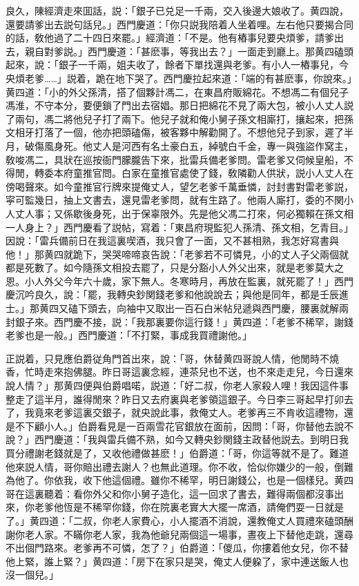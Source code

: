 良久，陳經濟走來囬話，説：「銀子已兑足一千兩，交入後邊大娘收了。黄四說，還要請爹出去説句話兒。」西門慶道：「你只説我陪着人坐着哩。左右他只要揭合同的話，敎他過了二十四日來罷。」經濟道：「不是。他有樁事兒要央煩爹，請爹出去，親自對爹説。」西門慶道：「甚麽事，等我出去？」一面走到廳上。那黄四磕頭起來，說：「銀子一千兩，姐夫收了，餘者下單找還與老爹。有小人一樁事兒，今央煩老爹……」説着，跪在地下哭了。西門慶拉起來道：「端的有甚麽事，你說來。」黄四道：「小的外父孫清，搭了個夥計馮二，在東昌府販綿花。不想馮二有個兒子馮淮，不守本分，要便鎖了門出去宿娼。那日把綿花不見了兩大包，被小人丈人説了兩句，馮二將他兒子打了兩下。他兒子就和俺小舅子孫文相廝打，攘起來，把孫文相牙打落了一個，他亦把頭磕傷，被客夥中解勸開了。不想他兒子到家，遲了半月，破傷風身死。他丈人是河西有名土豪白五，綽號白千金，專一與強盜作窝主，敎唆馮二，具狀在巡按衙門朦朧告下來，批雷兵備老爹問。雷老爹又伺候皇船，不得閒，轉委本府童推官問。白家在童推官處使了錢，敎隣勸人供狀，説小人丈人在傍喝聲來。如今童推官行牌來提俺丈人，望乞老爹千萬垂憐，討封書對雷老爹説，寜可監幾日，抽上文書去，還見雷老爹問，就有生路了。他兩人廝打，委的不関小人丈人事；又係歇後身死，出于保辜限外。先是他父馮二打來，何必獨賴在孫文相一人身上？」西門慶看了説帖，寫着：「東昌府現監犯人孫清、孫文相，乞青目。」因說：「雷兵備前日在我這裏喫酒，我只會了一面，又不甚相熟，我怎好寫書與他！」那黄四就跪下，哭哭啼啼哀告說：「老爹若不可憐見，小的丈人子父兩個就都是死數了。如今隨孫文相投去罷了，只是分豁小人外父出來，就是老爹莫大之恩。小人外父今年六十歲，家下無人。冬寒時月，再放在監裏，就死罷了！」西門慶沉吟良久，說：「罷，我轉央鈔関錢老爹和他說說去；與他是同年，都是壬辰進士。」那黄四又磕下頭去，向袖中又取出一百石白米帖兒遞與西門慶，腰裏就解兩封銀子來。西門慶不接，説：「我那裏要你這行錢！」黄四道：「老爹不稀罕，謝錢老爹也是一般。」西門慶道：「不打緊，事成我買禮謝他。」

正説着，只見應伯爵従角門首出來，說：「哥，休替黄四哥說人情，他閒時不燒香，忙時走來抱佛腿。昨日哥這裏念經，連茶兒也不送，也不來走走兒，今日還來說人情？」那黄四便與伯爵唱喏，説道：「好二叔，你老人家殺人哩！我因這件事整走了這半月，誰得閒來？昨日又去府裏與老爹領這銀子。今日李三哥起早打卯去了，我竟來老爹這裏交銀子，就央說此事，救俺丈人。老爹再三不肯收這禮物，還是不下顧小人。」伯爵看見是一百兩雪花官銀放在面前，因問：「哥，你替他去說不說？」西門慶道：「我與雷兵備不熟，如今又轉央鈔関錢主政替他説去。到明日我買分禮謝老錢就是了，又收他禮做甚麽！」伯爵道：「哥，你這等就不是了。難道他來説人情，哥你賠出禮去謝人？也無此道理。你不收，恰似你嫌少的一般，倒難為他了。你依我，收下他這個禮。雖你不稀罕，明日謝錢公，也是一個樣兒。黄四哥在這裏聽着：看你外父和你小舅子造化，這一回求了書去，難得兩個都沒事出來，你老爹他恆是不稀罕你錢，你在院裏老實大大擺一席酒，請俺們耍一日就是了。」黄四道：「二叔，你老人家費心，小人擺酒不消說，還教俺丈人買禮來磕頭酬謝你老人家。不瞞你老人家，我為他爺兒兩個這一場事，晝夜上下替他走跳，還尋不出個門路來。老爹再不可憐，怎了？」伯爵道：「儍瓜，你摟着他女兒，你不替他上緊，誰上緊？」黄四道：「房下在家只是哭，俺丈人便躱了，家中連送飯人也沒一個兒。」

